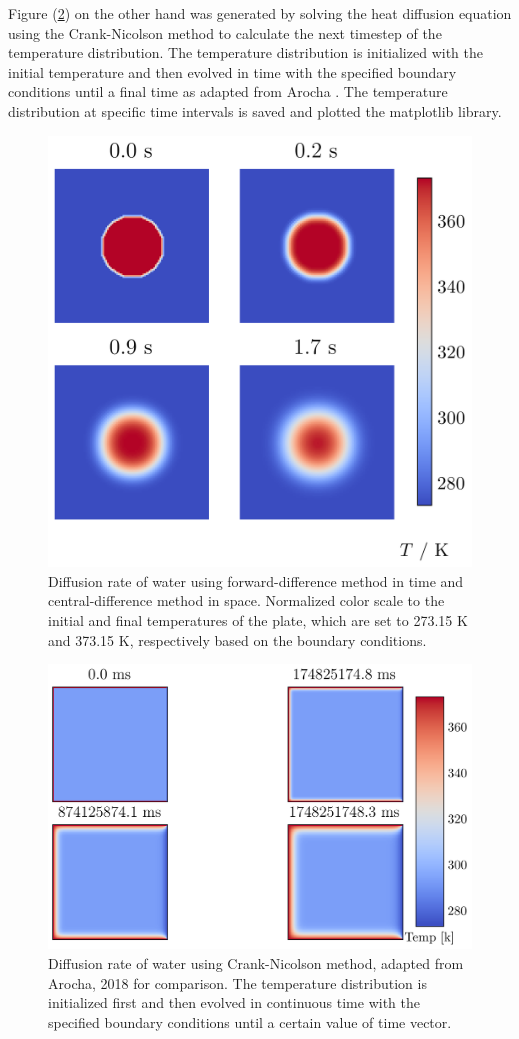 Figure (\ref{fig:cnm}) on the other hand was generated by solving the heat diffusion equation using  the Crank-Nicolson method to calculate the next timestep of the temperature distribution. The temperature distribution is initialized with the initial temperature and then evolved in time with the specified boundary conditions until a final time as adapted from Arocha \cite{Arocha2018}. The temperature distribution at specific time intervals is saved and plotted the matplotlib library.

\begin{figure}[htb!]
\begin{center}
\includegraphics[width=.49\textwidth]{images/th_water.png}
\vspace*{-8mm}
\caption{Diffusion rate of water using forward-difference method in time and central-difference method in space. Normalized color scale to the initial and final temperatures of the plate, which are set to 273.15 K and 373.15 K, respectively based on the boundary conditions.}
\label{fig:cdm}
\end{center}
\end{figure}

\begin{figure}[htb!]
\begin{center}
\includegraphics[width=.49\textwidth]{images/th_water_2.png}
\vspace*{-8mm}
\caption{Diffusion rate of water using Crank-Nicolson method, adapted from Arocha, 2018 \cite{Arocha2018} for comparison. The temperature distribution is initialized first and then evolved in continuous time with the specified boundary conditions until a certain value of time vector.}
\label{fig:cnm}
\end{center}
\end{figure}

